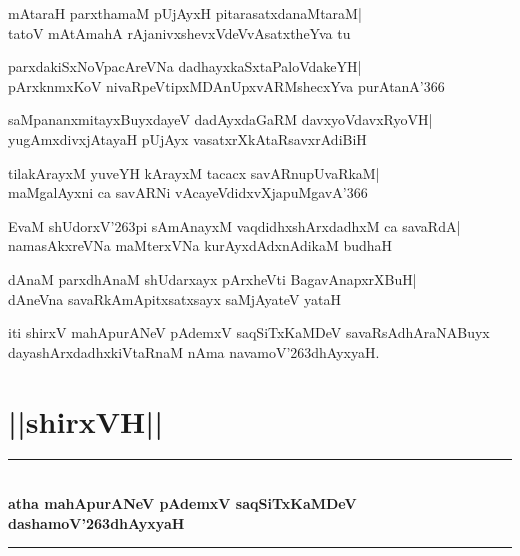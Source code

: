 \documentclass[twoside,12pt,openright]{book}
\def\S{\char'263}
\newcounter{shloka}[chapter]
\begin{document}
\begin{shloka}%
mAtaraH parxthamaM pUjAyxH pitarasatxdanaMtaraM|\\
tatoV mAtAmahA rAjanivxshevxVdeVvAsatxtheYva tu
\end{shloka}

\begin{shloka}%
parxdakiSxNoVpacAreVNa dadhayxkaSxtaPaloVdakeYH|\\
pArxknmxKoV nivaRpeVtipxMDAnUpxvARMshecxYva purAtanA\char'366
\end{shloka}

\begin{shloka}%
saMpananxmitayxBuyxdayeV dadAyxdaGaRM davxyoVdavxRyoVH|\\
yugAmxdivxjAtayaH pUjAyx vasatxrXkAtaRsavxrAdiBiH
\end{shloka}

\begin{shloka}%
tilakArayxM yuveYH kArayxM tacacx savARnupUvaRkaM|\\
maMgalAyxni ca savARNi vAcayeVdidxvXjapuMgavA\char'366
\end{shloka}

\begin{shloka}%
EvaM shUdorxV\S pi sAmAnayxM vaqdidhxshArxdadhxM ca savaRdA|\\
namasAkxreVNa maMterxVNa kurAyxdAdxnAdikaM budhaH
\end{shloka}

\begin{shloka}%
dAnaM parxdhAnaM shUdarxayx pArxheVti BagavAnapxrXBuH|\\
dAneVna savaRkAmApitxsatxsayx saMjAyateV yataH
\end{shloka}

\begin{center}
 iti shirxV mahApurANeV pAdemxV saqSiTxKaMDeV savaRsAdhAraNABuyx \\
dayashArxdadhxkiVtaRnaM nAma navamoV\S dhAyxyaH.
\end{center}

\chapter{||shirxVH||}
\begin{center}
\rule{2cm}{1pt}\\[0.5cm]
{\LARGE\bfseries atha mahApurANeV pAdemxV saqSiTxKaMDeV}\\[.3cm]
{\LARGE\bfseries dashamoV\S dhAyxyaH}\\[.3cm]
\rule{2cm}{1pt}\\
\end{center}
\end{document}
